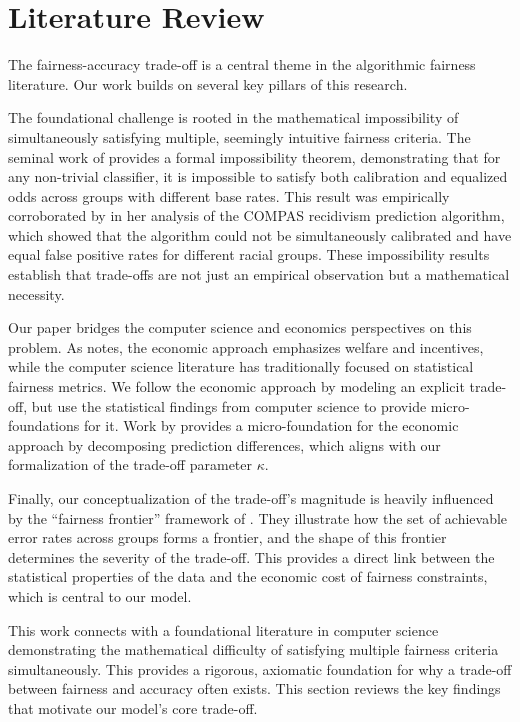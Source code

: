 \section{Literature Review}

The fairness-accuracy trade-off is a central theme in the algorithmic fairness literature. Our work builds on several key pillars of this research.

The foundational challenge is rooted in the mathematical impossibility of simultaneously satisfying multiple, seemingly intuitive fairness criteria. The seminal work of \citet{Kleinberg2017} provides a formal impossibility theorem, demonstrating that for any non-trivial classifier, it is impossible to satisfy both calibration and equalized odds across groups with different base rates. This result was empirically corroborated by \citet{Chouldechova2017} in her analysis of the COMPAS recidivism prediction algorithm, which showed that the algorithm could not be simultaneously calibrated and have equal false positive rates for different racial groups. These impossibility results establish that trade-offs are not just an empirical observation but a mathematical necessity.

Our paper bridges the computer science and economics perspectives on this problem. As \citet{Gans2025} notes, the economic approach emphasizes welfare and incentives, while the computer science literature has traditionally focused on statistical fairness metrics. We follow the economic approach by modeling an explicit trade-off, but use the statistical findings from computer science to provide micro-foundations for it. Work by \citet{Rambachan2020} provides a micro-foundation for the economic approach by decomposing prediction differences, which aligns with our formalization of the trade-off parameter $\kappa$.

Finally, our conceptualization of the trade-off's magnitude is heavily influenced by the ``fairness frontier'' framework of \citet{Liang2025}. They illustrate how the set of achievable error rates across groups forms a frontier, and the shape of this frontier determines the severity of the trade-off. This provides a direct link between the statistical properties of the data and the economic cost of fairness constraints, which is central to our model.

This work connects with a foundational literature in computer science demonstrating the mathematical difficulty of satisfying multiple fairness criteria simultaneously. This provides a rigorous, axiomatic foundation for why a trade-off between fairness and accuracy often exists. This section reviews the key findings that motivate our model's core trade-off.

